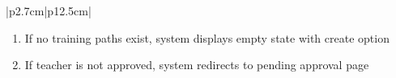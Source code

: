 \begin{table}[H]
\begin{tabular}{|p{2.7cm}|p{12.5cm}|}
\begin{minipage}[t]{\linewidth}
                                      \begin{enumerate}[topsep=0pt,itemsep=1pt,parsep=0pt,partopsep=0pt]
                                          \item If no training paths exist, system displays empty state with create option
                                          \item If teacher is not approved, system redirects to pending approval page
                                      \end{enumerate}
                                  \end{minipage} \\
        \hline
    \end{tabular}
    \label{tab:teacher-view-dashboard}
\end{table}

